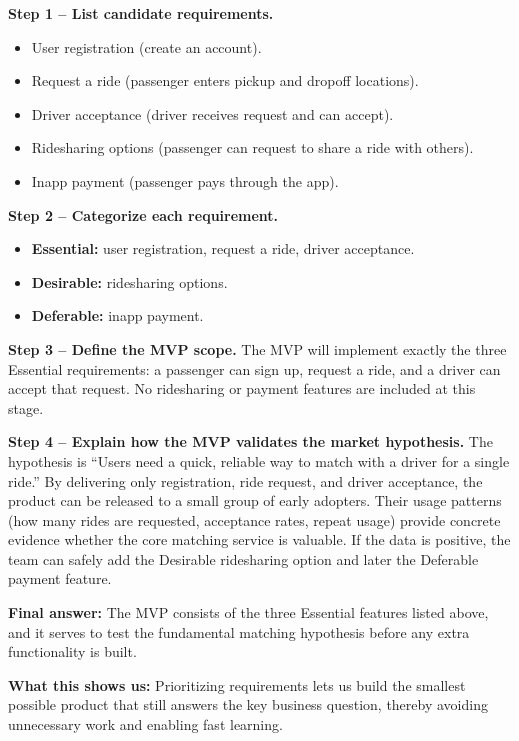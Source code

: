 \documentclass[12pt, a4paper]{article}
\begin{document}
\textbf{Step 1 -- List candidate requirements.}
\begin{itemize}
  \item User registration (create an account).  
  \item Request a ride (passenger enters pickup and dropoff locations).  
  \item Driver acceptance (driver receives request and can accept).  
  \item Ridesharing options (passenger can request to share a ride with others).  
  \item Inapp payment (passenger pays through the app).
\end{itemize}

\textbf{Step 2 -- Categorize each requirement.}
\begin{itemize}
  \item \textbf{Essential:} user registration, request a ride, driver acceptance.  
  \item \textbf{Desirable:} ridesharing options.  
  \item \textbf{Deferable:} inapp payment.
\end{itemize}

\textbf{Step 3 -- Define the MVP scope.}  
The MVP will implement exactly the three Essential requirements: a passenger can sign up, request a ride, and a driver can accept that request. No ridesharing or payment features are included at this stage.

\textbf{Step 4 -- Explain how the MVP validates the market hypothesis.}
The hypothesis is ``Users need a quick, reliable way to match with a driver for a single ride.'' By delivering only registration, ride request, and driver acceptance, the product can be released to a small group of early adopters. Their usage patterns (how many rides are requested, acceptance rates, repeat usage) provide concrete evidence whether the core matching service is valuable. If the data is positive, the team can safely add the Desirable ridesharing option and later the Deferable payment feature.

\textbf{Final answer:} The MVP consists of the three Essential features listed above, and it serves to test the fundamental matching hypothesis before any extra functionality is built.

\textbf{What this shows us:} Prioritizing requirements lets us build the smallest possible product that still answers the key business question, thereby avoiding unnecessary work and enabling fast learning.  
\end{document}
